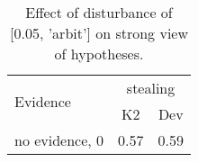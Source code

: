 \begin{table}\begin{tabular}{l|cc}\toprule\multirow{2}{*}{Evidence} & \multicolumn{2}{c}{stealing}\\& {K2} & {Dev}\\\midrule
no evidence, 0 & 0.57&0.59\\\bottomrule\end{tabular}\caption{Effect of disturbance of [0.05, 'arbit'] on strong view of hypotheses.}\end{table}